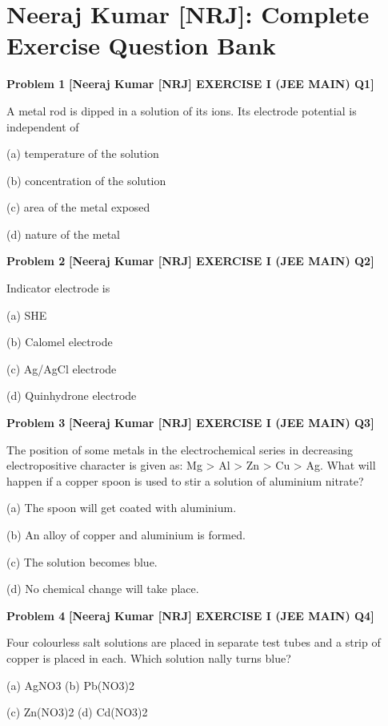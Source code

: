 \chapter{Neeraj Kumar [NRJ]: Complete Exercise Question Bank}
\label{chap:nrj_all_questions}

\begin{problembox}
\textbf{Problem 1} \hfill \textbf{[Neeraj Kumar [NRJ] EXERCISE I (JEE MAIN) Q1]}
\label{q:ext-nrj_all_questions-1}

A metal rod is dipped in a solution of its ions. Its 
electrode potential is  independent of
 
 (a) temperature of the solution
 
 (b) concentration of the solution
 
 (c) area of the metal exposed
 
 (d) nature of the metal
\end{problembox}

\begin{problembox}
\textbf{Problem 2} \hfill \textbf{[Neeraj Kumar [NRJ] EXERCISE I (JEE MAIN) Q2]}
\label{q:ext-nrj_all_questions-2}

Indicator electrode is
 
 (a) SHE
 
 (b) Calomel electrode
 
 (c) Ag/AgCl electrode
 
 (d) Quinhydrone electrode
\end{problembox}

\begin{problembox}
\textbf{Problem 3} \hfill \textbf{[Neeraj Kumar [NRJ] EXERCISE I (JEE MAIN) Q3]}
\label{q:ext-nrj_all_questions-3}

The position of some metals in the electrochemical 
series in decreasing electropositive character is 
given as: Mg > Al  > Zn > Cu > Ag. What will 
happen if a copper spoon is used to stir a solution 
of aluminium nitrate?
 
 (a)  The spoon will get coated with aluminium.
 
 (b)  An alloy of copper and aluminium is formed.
 
 (c) The solution becomes blue.
 
 (d) No chemical change will take place.
\end{problembox}

\begin{problembox}
\textbf{Problem 4} \hfill \textbf{[Neeraj Kumar [NRJ] EXERCISE I (JEE MAIN) Q4]}
\label{q:ext-nrj_all_questions-4}

Four colourless salt solutions are placed in 
separate test tubes and a strip of copper is placed 
in each. Which solution   nally turns blue?
 
 (a) AgNO3 
(b) Pb(NO3)2
 
 (c) Zn(NO3)2 
(d) Cd(NO3)2
\end{problembox}


